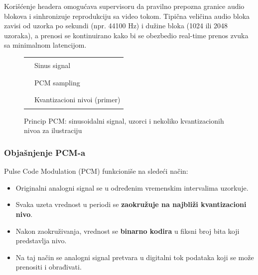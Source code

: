 \documentclass[a4paper,12pt]{article}
\begin{document}
Korišćenje headera omogućava supervisoru da pravilno prepozna granice audio blokova i sinhronizuje reprodukciju sa video tokom. Tipična veličina audio bloka zavisi od uzorka po sekundi (npr. 44100 Hz) i dužine bloka (1024 ili 2048 uzoraka), a prenosi se kontinuirano kako bi se obezbedio real-time prenos zvuka sa minimalnom latencijom.
\begin{figure}[h!]
\centering
{}

\begin{center}
\begin{tabular}{ll}
\textcolor{blue}{\rule{0.5cm}{0.5pt}} & Sinus signal \\
\textcolor{red}{\rule{0.5cm}{0.5pt}} & PCM sampling \\
\textcolor{black!70}{\rule{0.5cm}{0.5pt}} & Kvantizacioni nivoi (primer)
\end{tabular}
\end{center}

\caption{Princip PCM: sinusoidalni signal, uzorci i nekoliko kvantizacionih nivoa za ilustraciju}
\end{figure}

\subsubsection*{Objašnjenje PCM-a}

Pulse Code Modulation (PCM) funkcioniše na sledeći način:  
\begin{itemize}
    \item Originalni analogni signal se u određenim vremenskim intervalima uzorkuje.  
    \item Svaka uzeta vrednost u periodi se \textbf{zaokružuje na najbliži kvantizacioni nivo}.  
    \item Nakon zaokruživanja, vrednost se \textbf{binarno kodira} u fiksni broj bita koji predstavlja nivo.  
    \item Na taj način se analogni signal pretvara u digitalni tok podataka koji se može prenositi i obrađivati.
\end{itemize}
\end{document}
